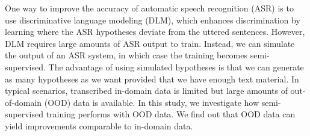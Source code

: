 One way to improve the accuracy of automatic speech recognition (ASR) is to use discriminative language modeling (DLM), which enhances discrimination by
 learning where the ASR hypotheses deviate from the uttered sentences. However,
 DLM requires large amounts of ASR output to train. Instead, we can simulate the
 output of an ASR system, in which case the training becomes semi-supervised.
 The advantage of using simulated hypotheses is that we can generate as many
 hypotheses as we want provided that we have enough text material. In typical
 scenarios, transcribed in-domain data is limited but large amounts of
 out-of-domain (OOD) data is available. In this study, we investigate how
 semi-supervised training performs with OOD data. We find out that OOD data can
 yield improvements comparable to in-domain data.

